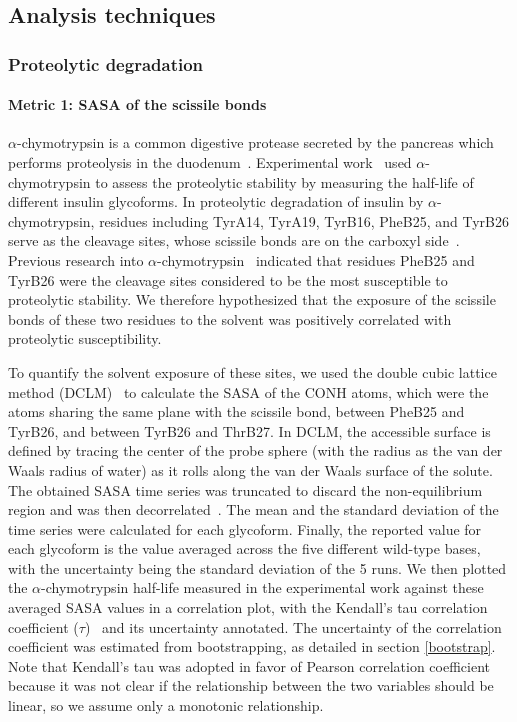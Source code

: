 \documentclass[9pt]{elife}
\begin{document}
\subsection{Analysis techniques} \label{analysis_method}
\subsubsection{Proteolytic degradation}
\paragraph{Metric 1: SASA of the scissile bonds}
$\alpha$-chymotrypsin is a common digestive protease secreted by the pancreas which performs proteolysis in the duodenum~\cite{wilcox19705}. Experimental work~\cite{guan2018chemically} used $\alpha$-chymotrypsin to assess the proteolytic stability by measuring the half-life of different insulin glycoforms. In proteolytic degradation of insulin by $\alpha$-chymotrypsin, residues including TyrA14, TyrA19, TyrB16, PheB25, and TyrB26 serve as the cleavage sites, whose scissile bonds are on the carboxyl side~\cite{schilling1991degradation}. Previous research into $\alpha$-chymotrypsin~\cite{schilling1991degradation} indicated that residues PheB25 and TyrB26 were the cleavage sites considered to be the most susceptible to proteolytic stability. We therefore hypothesized that the exposure of the scissile bonds of these two residues to the solvent was positively correlated with proteolytic susceptibility. 

To quantify the solvent exposure of these sites, we used the double cubic lattice method (DCLM)~\cite{eisenhaber1995double} to calculate the SASA of the CONH atoms, which were the atoms sharing the same plane with the scissile bond, between PheB25 and TyrB26, and between TyrB26 and ThrB27. In DCLM, the accessible surface is defined by tracing the center of the probe sphere (with the radius as the van der Waals radius of water) as it rolls along the van der Waals surface of the solute.  The obtained SASA time series was truncated to discard the non-equilibrium region and was then decorrelated~\cite{chodera2016simple}. The mean and the standard deviation of the time series were calculated for each glycoform. Finally, the reported value for each glycoform is the value averaged across the five different wild-type bases, with the uncertainty being the standard deviation of the 5 runs. We then plotted the $\alpha$-chymotrypsin half-life measured in the experimental work against these averaged SASA values in a correlation plot, with the Kendall's tau correlation coefficient ($\tau$)~\cite{kendall1948advanced} and its uncertainty annotated. The uncertainty of the correlation coefficient was estimated from bootstrapping, as detailed in section \ref{bootstrap}. Note that Kendall's tau was adopted in favor of Pearson correlation coefficient because it was not clear if the relationship between the two variables should be linear, so we assume only a monotonic relationship.
\end{document}

